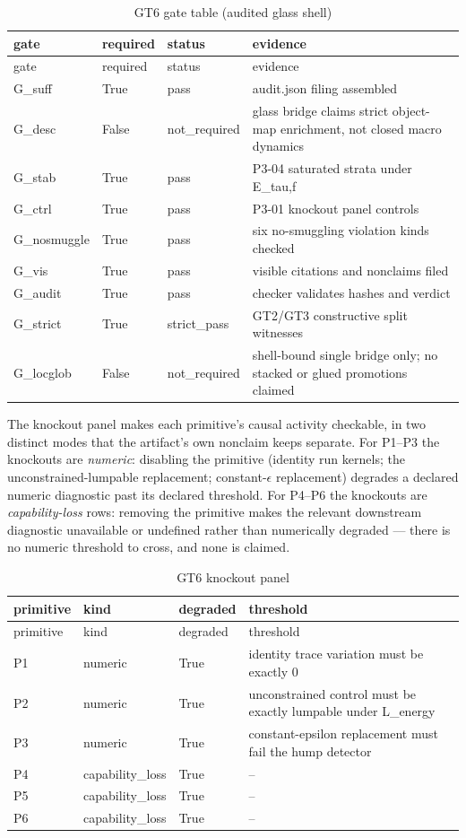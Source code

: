 \documentclass[11pt]{article}
\theoremstyle{definition}
\begin{document}
\begin{longtable}{lllp{6.5cm}}
\caption{GT6 gate table (audited glass shell)}\label{tab:gt6-gate-table} \\
\toprule
gate & required & status & evidence \\
\midrule
\endfirsthead
\toprule
gate & required & status & evidence \\
\midrule
\endhead
\bottomrule
\endfoot
G\_suff & True & pass & audit.json filing assembled \\
G\_desc & False & not\_required & glass bridge claims strict object-map enrichment, not closed macro dynamics \\
G\_stab & True & pass & P3-04 saturated strata under E\_{tau,f} \\
G\_ctrl & True & pass & P3-01 knockout panel controls \\
G\_nosmuggle & True & pass & six no-smuggling violation kinds checked \\
G\_vis & True & pass & visible citations and nonclaims filed \\
G\_audit & True & pass & checker validates hashes and verdict \\
G\_strict & True & strict\_pass & GT2/GT3 constructive split witnesses \\
G\_locglob & False & not\_required & shell-bound single bridge only; no stacked or glued promotions claimed \\
\bottomrule
\end{longtable}
 
The knockout panel makes each primitive's causal activity checkable, in two distinct modes that
the artifact's own nonclaim keeps separate. For P1--P3 the knockouts are \emph{numeric}: disabling
the primitive (identity run kernels; the unconstrained-lumpable replacement; constant-$\epsilon$
replacement) degrades a declared numeric diagnostic past its declared threshold. For P4--P6 the
knockouts are \emph{capability-loss} rows: removing the primitive makes the relevant downstream
diagnostic unavailable or undefined rather than numerically degraded --- there is no numeric
threshold to cross, and none is claimed.

\begin{longtable}{lllp{6.5cm}}
\caption{GT6 knockout panel}\label{tab:gt6-knockouts} \\
\toprule
primitive & kind & degraded & threshold \\
\midrule
\endfirsthead
\toprule
primitive & kind & degraded & threshold \\
\midrule
\endhead
\bottomrule
\endfoot
P1 & numeric & True & identity trace variation must be exactly 0 \\
P2 & numeric & True & unconstrained control must be exactly lumpable under L\_energy \\
P3 & numeric & True & constant-epsilon replacement must fail the hump detector \\
P4 & capability\_loss & True & -- \\
P5 & capability\_loss & True & -- \\
P6 & capability\_loss & True & -- \\
\bottomrule
\end{longtable}
 
\end{document}
